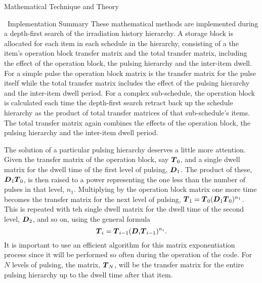 \begin{chapter}{Mathematical Technique and Theory}
\begin{section}{\ALARA\ Implementation Summary}
  These mathematical methods are implemented during a depth-first
  search of the irradiation history hierarchy.  A storage block is
  allocated for each item in each schedule in the hierarchy,
  consisting of a the item's operation block transfer matrix and the
  total transfer matrix, including the effect of the operation block,
  the pulsing hierarchy and the inter-item dwell.  For a simple pulse
  the operation block matrix is the transfer matrix for the pulse
  itself while the total transfer matrix includes the effect of the
  pulsing hierarchy and the inter-item dwell period.  For a complex
  sub-schedule, the operation block is calculated each time the
  depth-first search retract back up the schedule hierarchy as the
  product of total transfer matrices of that sub-schedule's items.
  The total transfer matrix again combines the effects of the
  operation block, the pulsing hierarchy and the inter-item dwell
  period.
  
  The solution of a particular pulsing hierarchy deserves a little
  more attention.  Given the transfer matrix of the operation block,
  say $\mbox{\boldmath $T$}_0$, and a single dwell matrix for the dwell time of the
  first level of pulsing, $\mbox{\boldmath $D$}_1$.  The product of these,
  $\mbox{\boldmath $D$}_1\mbox{\boldmath $T$}_0$, is then raised to a power representing the one
  less than the number of pulses in that level, $n_1$.  Multiplying by
  the operation block matrix one more time becomes the transfer matrix
  for the next level of pulsing, $\mbox{\boldmath $T$}_1 =
  \mbox{\boldmath $T$}_0(\mbox{\boldmath $D$}_1\mbox{\boldmath $T$}_0)^{n_1}$.  This is repeated with teh
  single dwell matrix for the dwell time of the second level,
  $\mbox{\boldmath $D$}_2$, and so on, using the general formula\cite{ref:spangler}
  \begin{equation}
    \mbox{\boldmath $T$}_i = \mbox{\boldmath $T$}_{i-1}(\mbox{\boldmath $D$}_{i}\mbox{\boldmath $T$}_{i-1})^{n_i}.\label{eqn:pulsing.recurse}
  \end{equation}
  It is important to use an efficient algorithm\cite{ref:UofT_csc280}
  for this matrix exponentiation process since it will be performed so
  often during the operation of the code.  For $N$ levels of pulsing,
  the matrix, $\mbox{\boldmath $T$}_{N}$, will be the transfer matrix for the
  entire pulsing hierarchy up to the dwell time after that item.
\end{section}

\end{chapter}

